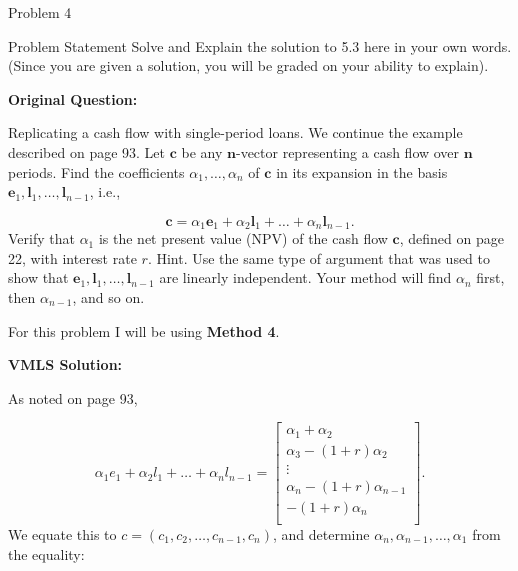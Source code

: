 \begin{problem}{Problem 4}
    \begin{statement}{Problem Statement}
        Solve and Explain the solution to 5.3 here in your own words. (Since you are given a solution, you will be graded on your ability to explain). \vspace*{1em}

        \textbf{Original Question:} \vspace*{1em}

        Replicating a cash flow with single-period loans. We continue the example described on page 93. Let $\mathbf{c}$ be any $\mathbf{n}$-vector representing a cash flow over $\mathbf{n}$ periods. Find the coefficients $\alpha_1, \ldots, \alpha_n$ of $\mathbf{c}$ in its expansion in the basis $\mathbf{e}_1, \mathbf{l}_1, \ldots, \mathbf{l}_{n-1}$, i.e.,

        \begin{equation*}
            \mathbf{c} = \alpha_1 \mathbf{e}_1 + \alpha_2 \mathbf{l}_1 + \ldots + \alpha_n \mathbf{l}_{n-1}.
        \end{equation*}
        Verify that $\alpha_1$ is the net present value (NPV) of the cash flow $\mathbf{c}$, defined on page 22, with interest rate $r$. Hint. Use the same type of argument that was used to show that $\mathbf{e}_1, \mathbf{l}_1, \ldots, \mathbf{l}_{n-1}$ are linearly independent. Your method will find $\alpha_n$ first, then $\alpha_{n-1}$, and so on.
    \end{statement}

    \begin{Highlight}[Solution]
        For this problem I will be using \textbf{Method 4}. \vspace*{1em}

        \textbf{VMLS Solution:} \vspace*{1em}

        As noted on page 93,

        \begin{equation*}
            \alpha_{1}e_{1} + \alpha_{2}l_{1} + \dots + \alpha_{n}l_{n - 1} = 
            \begin{bmatrix}
                \alpha_{1} + \alpha_{2} \\
                \alpha_{3} - (1 + r)\alpha_{2} \\
                \vdots \\
                \alpha_{n} - (1 + r)\alpha_{n - 1} \\
                -(1 + r)\alpha_{n} \\
            \end{bmatrix}.
        \end{equation*}
        We equate this to $c = (c_{1}, c_{2}, \dots, c_{n-1}, c_{n})$, and determine $\alpha_{n}, \alpha_{n - 1}, \dots, \alpha_{1}$ from the equality:


\end{Highlight}
\end{problem}
